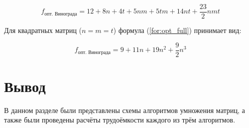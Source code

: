 \begin{equation}
	\label{for:opt_full}
	f_{\text{опт. Винограда}} = 12 + 8n + 4t + 5nm + 5tm + 14nt + \frac{23}{2}nmt
\end{equation}

Для квадратных матриц (\( n = m = t \)) формула (\ref{for:opt_full}) принимает вид:

\begin{equation}
	\label{for:opt_square}
	f_{\text{опт. Винограда}} = 9 + 11n + 19n^2 + \frac{9}{2}n^3
\end{equation}

\section*{Вывод}

В данном разделе были представлены схемы алгоритмов умножения матриц, а также были проведены расчёты трудоёмкости каждого из трём алгоритмов.

\clearpage
